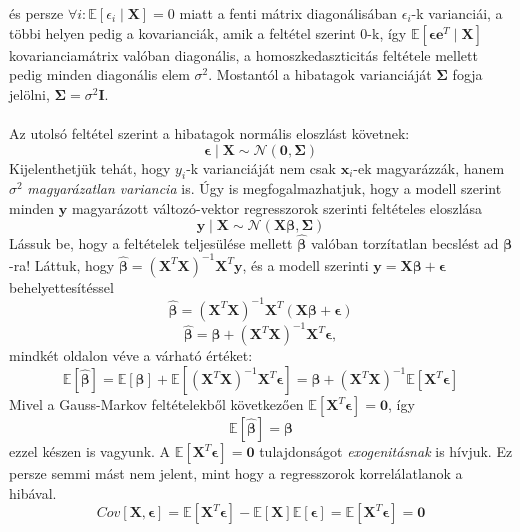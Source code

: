 \documentclass[14p]{report}
\def\pmb{\boldsymbol}
\def\ebeta{\hat{\pmb{\beta}}}
\def\e{\epsilon}
\begin{document}
	és persze $\forall i : \mathbb{E}[\e_i \mid \pmb{X}] = 0$ miatt a fenti mátrix diagonálisában $\e_i$-k varianciái, a többi helyen pedig a kovarianciák, amik a feltétel szerint $0$-k, így $\mathbb{E}[\pmb{\e}\pmb{e}^T \mid \pmb{X}]$ kovarianciamátrix valóban diagonális, a homoszkedaszticitás feltétele mellett pedig minden diagonális elem $\sigma^2$. Mostantól a hibatagok varianciáját $\pmb{\Sigma}$ fogja jelölni, $\pmb{\Sigma} = \sigma^2\pmb{I}$.
	\\
	\\
	Az utolsó feltétel szerint a hibatagok normális eloszlást követnek:
	\[
	\pmb{\e} \mid \pmb{X} \sim \mathcal{N}(\pmb{0}, \pmb{\Sigma})
	\]
	Kijelenthetjük tehát, hogy $y_i$-k varianciáját nem csak $\pmb{x}_i$-ek magyarázzák, hanem $\sigma^2$ \emph{magyarázatlan variancia} is. Úgy is megfogalmazhatjuk, hogy a modell szerint minden $\pmb{y}$ magyarázott változó-vektor regresszorok szerinti feltételes eloszlása
	\[
	\pmb{y} \mid \pmb{X} \sim \mathcal{N}(\pmb{X}\pmb{\beta}, \pmb{\Sigma})
	\]
	Lássuk be, hogy a feltételek teljesülése mellett $\ebeta$ valóban torzítatlan becslést ad $\pmb{\beta}$-ra! Láttuk, hogy $\ebeta = (\pmb{X}^T\pmb{X})^{-1}\pmb{X}^T\pmb{y}$, és a modell szerinti $\pmb{y} = \pmb{X}\pmb{\beta} + \pmb{\e}$ behelyettesítéssel
	\[
	\ebeta = (\pmb{X}^T\pmb{X})^{-1}\pmb{X}^T(\pmb{X}\pmb{\beta} + \pmb{\e})
	\]
	\[
	\ebeta = \pmb{\beta} + (\pmb{X}^T\pmb{X})^{-1}\pmb{X}^T\pmb{\e},
	\]
	mindkét oldalon véve a várható értéket:
	\[
	\mathbb{E}[\ebeta] = \mathbb{E}[\pmb{\beta}] + \mathbb{E}[(\pmb{X}^T\pmb{X})^{-1}\pmb{X}^T\pmb{\e}] = \pmb{\beta} + (\pmb{X}^T\pmb{X})^{-1}\mathbb{E}[\pmb{X}^T\pmb{\e}]
	\]
	Mivel a Gauss-Markov feltételekből következően $\mathbb{E}[\pmb{X}^T\pmb{\e}] = \pmb{0}$, így
	\[
	\mathbb{E}[\ebeta] = \pmb{\beta}
	\]
	ezzel készen is vagyunk. A $\mathbb{E}[\pmb{X}^T\pmb{\e}] = \pmb{0}$ tulajdonságot \emph{exogenitásnak} is hívjuk. Ez persze semmi mást nem jelent, mint hogy a regresszorok korrelálatlanok a hibával.
	\[
		Cov[\pmb{X}, \pmb{\e}] = \mathbb{E}[\pmb{X}^T\pmb{\e}] - \mathbb{E}[\pmb{X}]\mathbb{E}[\pmb{\e}] = \mathbb{E}[\pmb{X}^T\pmb{\e}] = \pmb{0}
	\]
	
\end{document}
